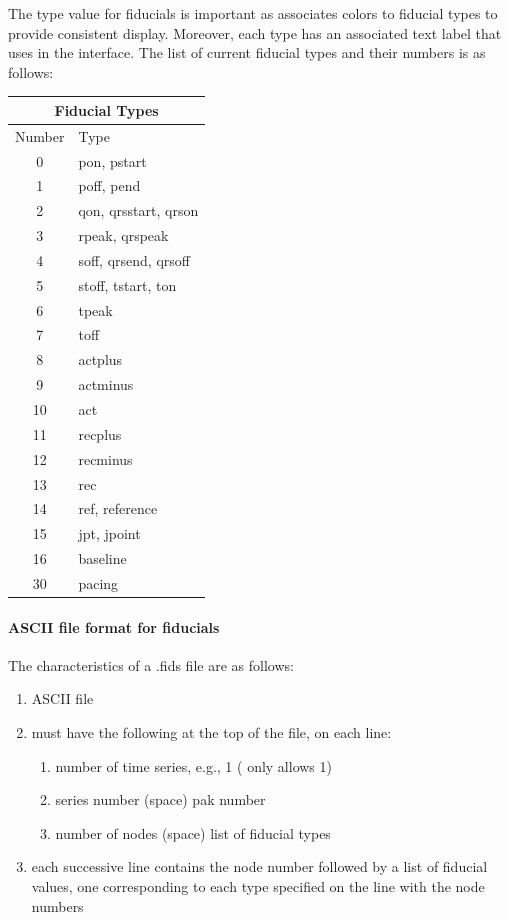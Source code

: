 The type value for fiducials is important as \map{} associates colors to
fiducial types to provide consistent display.  Moreover, each type has an
associated text label that \map{} uses in the interface.  The list of
current fiducial types and their numbers is as follows:

\bigskip

\begin{center}
\begin{tabular}[h]{|c|l|} \hline
\multicolumn{2}{|c|}{Fiducial Types} \\  \hline \hline
Number & Type \\ \hline 
 0 & pon, pstart \\
 1 & poff, pend \\
 2 & qon, qrsstart, qrson \\
 3 & rpeak, qrspeak \\
 4 & soff, qrsend, qrsoff \\
 5 & stoff, tstart, ton \\
 6 & tpeak \\
 7 & toff \\
 8 & actplus \\
 9 & actminus \\
 10 & act \\
 11 & recplus \\
 12 & recminus \\
 13 & rec \\
 14 & ref, reference \\
 15 & jpt, jpoint \\
 16 & baseline \\
 30 & pacing \\
\hline
\end{tabular}
\end{center}

\paragraph{ASCII file format for fiducials}

The characteristics of a .fids file are as follows:
\begin{enumerate}
  \item ASCII file
  \item must have the following at the top of the file, on each line:
  \begin{enumerate}
    \item number of time series, e.g., 1 (\map{} only allows 1)
    \item series number (space) pak number
    \item number of nodes (space) list of fiducial types
  \end{enumerate}
  \item each successive line contains the node number followed by
        a list of fiducial values, one corresponding to each
        type specified on the line with the node numbers
\end{enumerate}

